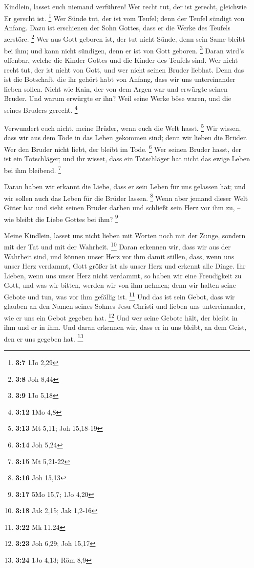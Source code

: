  Kindlein, lasset euch niemand verführen! Wer recht tut, der
ist gerecht, gleichwie Er gerecht ist. \footnote{\textbf{3:7} 1Jo 2,29}
 Wer Sünde tut, der ist vom Teufel; denn der Teufel sündigt
von Anfang. Dazu ist erschienen der Sohn Gottes, dass er die Werke des
Teufels zerstöre. \footnote{\textbf{3:8} Joh 8,44}  Wer aus
Gott geboren ist, der tut nicht Sünde, denn sein Same bleibt bei ihm;
und kann nicht sündigen, denn er ist von Gott geboren. \footnote{\textbf{3:9}
  1Jo 5,18}  Daran wird's offenbar, welche die Kinder
Gottes und die Kinder des Teufels sind. Wer nicht recht tut, der ist
nicht von Gott, und wer nicht seinen Bruder liebhat.  Denn
das ist die Botschaft, die ihr gehört habt von Anfang, dass wir uns
untereinander lieben sollen.  Nicht wie Kain, der von dem
Argen war und erwürgte seinen Bruder. Und warum erwürgte er ihn? Weil
seine Werke böse waren, und die seines Bruders gerecht. \footnote{\textbf{3:12}
  1Mo 4,8}

 Verwundert euch nicht, meine Brüder, wenn euch die Welt
hasst. \footnote{\textbf{3:13} Mt 5,11; Joh 15,18-19}  Wir
wissen, dass wir aus dem Tode in das Leben gekommen sind; denn wir
lieben die Brüder. Wer den Bruder nicht liebt, der bleibt im Tode.
\footnote{\textbf{3:14} Joh 5,24}  Wer seinen Bruder hasst,
der ist ein Totschläger; und ihr wisset, dass ein Totschläger hat nicht
das ewige Leben bei ihm bleibend. \footnote{\textbf{3:15} Mt 5,21-22}

 Daran haben wir erkannt die Liebe, dass er sein Leben für
uns gelassen hat; und wir sollen auch das Leben für die Brüder lassen.
\footnote{\textbf{3:16} Joh 15,13}  Wenn aber jemand dieser
Welt Güter hat und sieht seinen Bruder darben und schließt sein Herz vor
ihm zu, -- wie bleibt die Liebe Gottes bei ihm? \footnote{\textbf{3:17}
  5Mo 15,7; 1Jo 4,20}

 Meine Kindlein, lasset uns nicht lieben mit Worten noch
mit der Zunge, sondern mit der Tat und mit der Wahrheit. \footnote{\textbf{3:18}
  Jak 2,15; Jak 1,2-16}  Daran erkennen wir, dass wir aus
der Wahrheit sind, und können unser Herz vor ihm damit stillen,
 dass, wenn uns unser Herz verdammt, Gott größer ist als
unser Herz und erkennt alle Dinge.  Ihr Lieben, wenn uns
unser Herz nicht verdammt, so haben wir eine Freudigkeit zu Gott,
 und was wir bitten, werden wir von ihm nehmen; denn wir
halten seine Gebote und tun, was vor ihm gefällig ist. \footnote{\textbf{3:22}
  Mk 11,24}  Und das ist sein Gebot, dass wir glauben an
den Namen seines Sohnes Jesu Christi und lieben uns untereinander, wie
er uns ein Gebot gegeben hat. \footnote{\textbf{3:23} Joh 6,29; Joh
  15,17}  Und wer seine Gebote hält, der bleibt in ihm und
er in ihm. Und daran erkennen wir, dass er in uns bleibt, an dem Geist,
den er uns gegeben hat. \footnote{\textbf{3:24} 1Jo 4,13; Röm 8,9}

